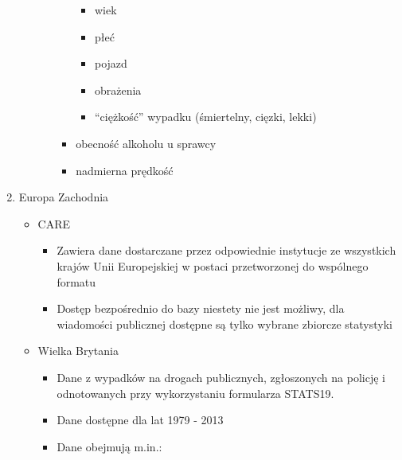 \begin{enumerate}
\begin{itemize}
\begin{itemize}
\begin{itemize}
        \begin{itemize}
        \itemsep-14pt\parskip0pt
        \item
          wiek\\
        \item
          płeć\\
        \item
          pojazd\\
        \item
          obrażenia\\
        \item
          ``ciężkość'' wypadku (śmiertelny, cięzki, lekki)\\
        \end{itemize}
      \item
        obecność alkoholu u sprawcy\\
      \item
        nadmierna prędkość\\
      \end{itemize}
    \end{itemize}
  \end{itemize}
\item
  Europa Zachodnia

  \begin{itemize}
  \item
    CARE \cite{care}

    \begin{itemize}
    \itemsep-14pt\parskip0pt      
    \item
      Zawiera dane dostarczane przez odpowiednie instytucje ze
      wszystkich krajów Unii Europejskiej w postaci przetworzonej do
      wspólnego formatu\\
    \item
      Dostęp bezpośrednio do bazy niestety nie jest możliwy, dla
      wiadomości publicznej dostępne są tylko wybrane zbiorcze
      statystyki\\
    \end{itemize}
  \item
    Wielka Brytania \cite{wb}

    \begin{itemize}
    \item
      Dane z wypadków na drogach publicznych, zgłoszonych na policję i
      odnotowanych przy wykorzystaniu formularza STATS19.\\
    \item
      Dane dostępne dla lat 1979 - 2013\\
    \item
      Dane obejmują m.in.:


\end{itemize}
\end{itemize}
\end{enumerate}
